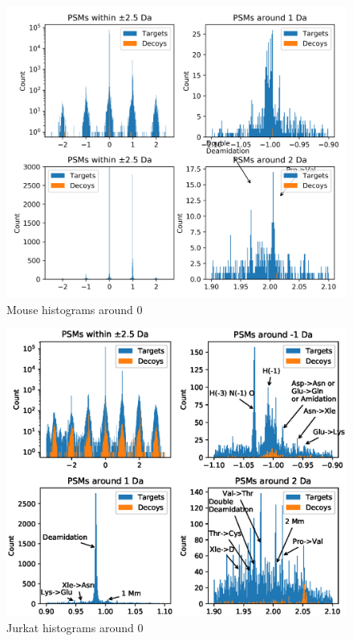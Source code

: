 \documentclass[journal=jprobs,manuscript=article]{achemso}
\begin{document}
\begin{figure}
\caption{Mouse histograms around 0}
\label{fig:fig3mouse-1012}
\includegraphics{fig3mouse-1012}
\end{figure}

\begin{figure}
\caption{Jurkat histograms around 0}
\label{fig:fig3jurkat-1012}
\includegraphics{fig3jurkat-1012}
\end{figure}
\end{document}
